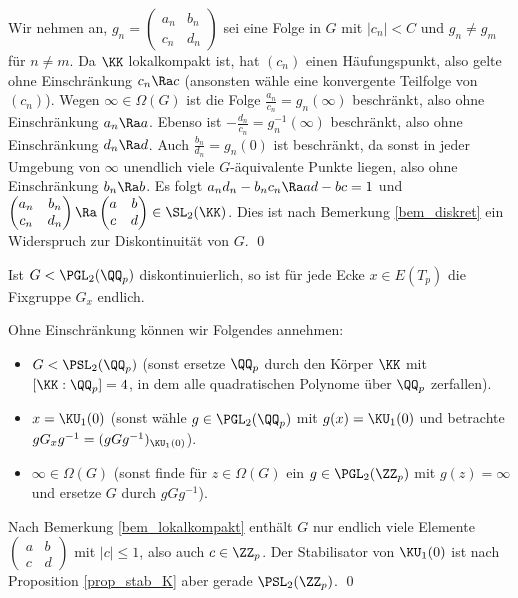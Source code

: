 \bew Wir nehmen an,
$g_n=\begin{pmatrix}
a_n & b_n \\ c_n & d_n
\end{pmatrix}$ sei eine Folge in $G$ mit $|c_n|<C$ und $g_n\neq g_m$
für $n\neq m$. Da $\KK$ lokalkompakt ist, hat $(c_n)$ einen 
Häufungspunkt, also gelte ohne Einschränkung $c_n\Ra c$ (ansonsten
wähle eine konvergente Teilfolge von $(c_n)$).
Wegen $\infty\in\Omega(G)$ ist die Folge $\frac{a_n}{c_n}=g_n(\infty)$
beschränkt, also ohne Einschränkung $a_n\Ra a$.
Ebenso ist $-\frac{d_n}{c_n}=g_n^{-1}(\infty)$ beschränkt,
also ohne Einschränkung $d_n\Ra d$. Auch $\frac{b_n}{d_n}=g_n(0)$
ist beschränkt, da sonst in jeder Umgebung von $\infty$
unendlich viele $G$-äquivalente Punkte liegen, also
ohne Einschränkung $b_n\Ra b$.
Es folgt $a_n d_n - b_n c_n \Ra ad-bc=1$ und
$\begin{pmatrix}
a_n & b_n \\ c_n & d_n
\end{pmatrix}\Ra
\begin{pmatrix}
a & b \\ c & d
\end{pmatrix}\in\SL_2(\KK)$.
Dies ist nach Bemerkung \ref{bem_diskret} ein Widerspruch zur
Diskontinuität von $G$.
\qed

\FOLG\label{folg_diskont}
Ist $G<\PGL_2(\QQ_p)$ diskontinuierlich, so ist für jede
Ecke $x\in E(T_p)$ die Fixgruppe $G_x$ endlich.

\bew Ohne Einschränkung können wir Folgendes annehmen:
\begin{itemize}
\item $G<\PSL_2(\QQ_p)$ (sonst ersetze $\QQ_p$ durch den Körper $\KK$
mit $[\KK:\QQ_p]=4$, in dem alle quadratischen Polynome über $\QQ_p$
zerfallen).
\item
$x=\KU_1(0)$ (sonst wähle $g\in\PGL_2(\QQ_p)$ mit $g(x)=\KU_1(0)$
und betrachte $g G_x g^{-1}=(gGg^{-1})_{\KU_1(0)}$).
\item $\infty\in\Omega(G)$ (sonst finde für $z\in\Omega(G)$ ein
$g\in\PGL_2(\ZZ_p)$ mit $g(z)=\infty$ und ersetze $G$ durch
$gGg^{-1}$).
\end{itemize}
Nach Bemerkung \ref{bem_lokalkompakt} enthält $G$ nur endlich viele
Elemente $\begin{pmatrix}
a & b \\ c & d
\end{pmatrix}$ mit $|c|\leq 1$, also auch $c\in\ZZ_p$.
Der Stabilisator von $\KU_1(0)$ ist nach Proposition \ref{prop_stab_K}
aber gerade $\PSL_2(\ZZ_p)$.
\qed

